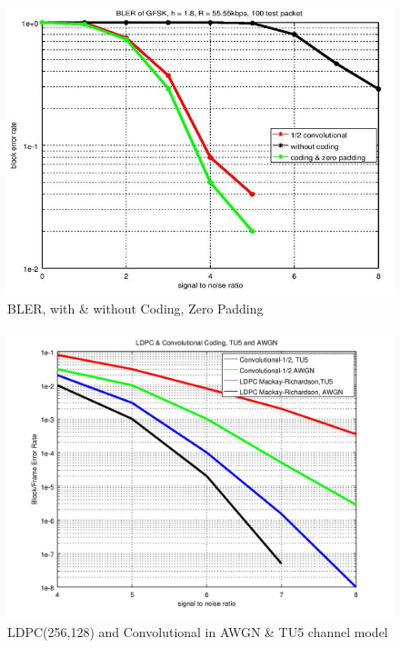 \begin{figure}[h]
\centering
\includegraphics[scale=0.9]{Figures/bler_coding.jpg}
\caption{BLER, with \& without Coding, Zero Padding}
\label{bler_coding}
\end{figure}


\begin{figure}[h]
\centering
\includegraphics[scale=0.6]{Figures/bler_conv.jpg}
\caption{LDPC(256,128) and Convolutional in AWGN \& TU5 channel model}
\label{bler_conv}
\end{figure}

